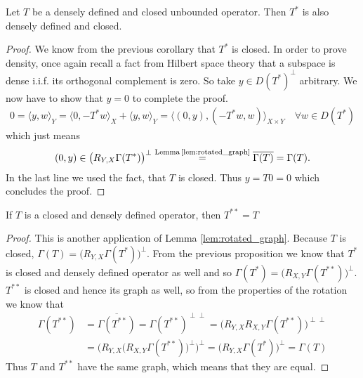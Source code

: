 \documentclass[../master_thesis.tex]{subfiles}
\begin{document}
\begin{proposition}\label{prop:adjoint_of_densely_defined_closed}
    Let $T$ be a densely defined and closed unbounded operator.
    Then $T^*$ is also densely defined and closed.
\end{proposition}
\begin{proof}
    We know from the previous corollary that $T^*$ is closed. 
    In order to prove density, once again recall a fact from Hilbert space
    theory that a subspace is dense i.i.f. its orthogonal complement 
    is zero. So take $y \in D(T^*)^\perp$ arbitrary. We now have to show that 
    $y=0$ to complete the proof.
    \begin{align*}
        0 = \langle y, w \rangle_Y 
        = \langle 0, -T^*w \rangle _X + \langle y, w \rangle _Y
        = \langle (0,y), (-T^*w,w) \rangle _{X\times Y} \quad \forall w \in D(T^*)
    \end{align*}
    which just means
    \begin{align*}
        (0,y) \in \big(R_{Y,X}\Gamma(T^*)\big)^\perp 
        \stackrel{\text{Lemma\,\ref{lem:rotated_graph}} }{=} \overline{\Gamma(T)}
        = \Gamma(T).
    \end{align*}
    In the last line we used the fact, that $T$ is closed. 
    Thus $y = T0 = 0$ which concludes the proof.
\end{proof}

\begin{proposition}\label{prop:T_starstar_equals_T}
    If $T$ is a closed and densely defined operator, 
    then $T^{**} = T$
\end{proposition}
\begin{proof}
    This is another application of Lemma \ref{lem:rotated_graph}. 
    Because $T$ is closed, $\Gamma(T) = \big( R_{Y,X}\Gamma(T^*)\big)^\perp$. 
    From the previous proposition we know that $T^*$ is closed and 
    densely defined operator as well and so $\Gamma(T^*) = \big( R_{X,Y}\Gamma(T^{**})\big)^\perp$.
    $T^{**}$ is closed and hence its graph as well, so
    from the properties of the rotation we know that
    \begin{align*}
        \Gamma(T^{**}) 
        &= \overline{\Gamma(T^{**})} 
        = \Gamma(T^{**})^{\perp \perp}
        = \big( R_{Y,X} R_{X,Y}\Gamma(T^{**})   \big)^{\perp \perp}
        \\ &= \Big( R_{Y,X}\big(R_{X,Y}\Gamma(T^{**})\big)^{\perp} \Big)^\perp
        = \Big( R_{Y,X} \Gamma(T^*) \Big)^\perp
        = \Gamma(T)
    \end{align*}
    Thus $T$ and $T^{**}$ have the same graph, which means that they are equal.
\end{proof}
\end{document}
